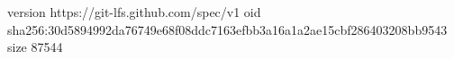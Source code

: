 version https://git-lfs.github.com/spec/v1
oid sha256:30d5894992da76749e68f08ddc7163efbb3a16a1a2ae15cbf286403208bb9543
size 87544
